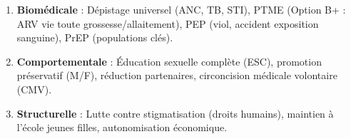 \documentclass[11pt]{article}
\begin{document}
\begin{bilan}
\begin{methode}
\begin{enumerate}
    \item \textbf{Biomédicale} : Dépistage universel (ANC, TB, STI), PTME (Option B+ : ARV vie toute grossesse/allaitement), PEP (viol, accident exposition sanguine), PrEP (populations clés).
    \item \textbf{Comportementale} : Éducation sexuelle complète (ESC), promotion préservatif (M/F), réduction partenaires, circoncision médicale volontaire (CMV).
    \item \textbf{Structurelle} : Lutte contre stigmatisation (droits humains), maintien à l'école jeunes filles, autonomisation économique.
\end{enumerate}
\end{methode}

\end{bilan}
\end{document}
